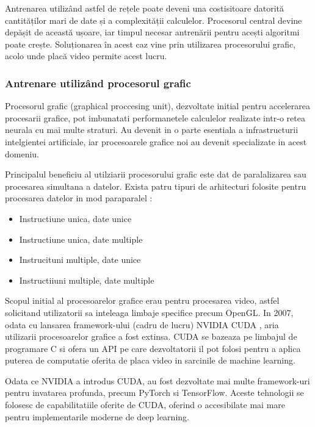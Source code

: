 \documentclass[a4paper, 12pt]{report}
\begin{document}
	Antrenarea utilizând astfel de rețele poate deveni una costisitoare datorită cantităților mari de date și a complexității calculelor. Procesorul central devine depășit de această ușoare, iar timpul necesar antrenării pentru acești algoritmi poate crește. Soluționarea în acest caz vine prin utilizarea procesorului grafic, acolo unde placă video permite acest lucru.
	
	\clearpage
	\subsubsection{Antrenare utilizând procesorul grafic}
	Procesorul grafic (graphical proccesing unit), dezvoltate initial pentru accelerarea procesarii grafice, pot imbunatati performanetele calculelor realizate intr-o retea neurala cu mai multe straturi. Au devenit in o parte esentiala a  infrastructurii intelgientei artificiale, iar procesoarele grafice noi au devenit specializate in acest domeniu.
	
	Principalul beneficiu al utilziarii procesorului grafic este dat de paralalizarea sau procesarea simultana a datelor. Exista patru tipuri de arhitecturi folosite pentru procesarea datelor in mod paraparalel :
	
	\begin{itemize}
		\item Instructiune unica, date unice
		\item Instructiune unica, date multiple
		\item Instrucituni multiple, date unice
		\item Instructiiuni multiple, date multiple
	\end{itemize}
	
	Scopul initial al procesoarelor grafice erau pentru procesarea video, astfel solicitand utilizatorii sa inteleaga limbaje specifice precum OpenGL. In 2007, odata cu lansarea framework-ului (cadru de lucru) NVIDIA CUDA \cite{cuda}, aria utilizarii procesoarelor grafice a fost extinsa. CUDA se bazeaza pe limbajul de programare C si ofera un API pe care dezvoltatorii il pot folosi pentru a aplica puterea de computatie oferita de placa video in sarcinile de machine learning.
	
	Odata ce NVIDIA a introdus CUDA, au fost dezvoltate mai multe framework-uri pentru invatarea profunda, precum PyTorch si TensorFlow. Aceste tehnologii se folosesc de capabilitatiile oferite de CUDA, oferind o accesibilate mai mare pentru implementarile moderne de deep learning.
	
\end{document}
